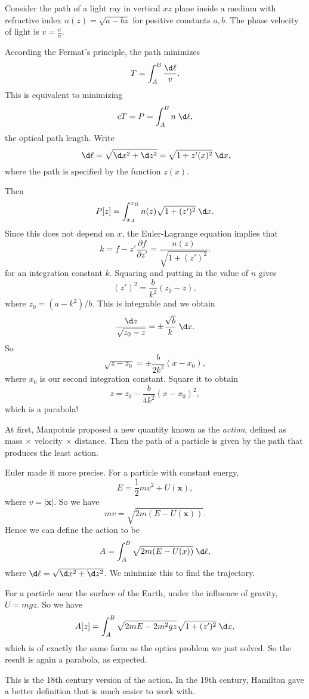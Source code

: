 \documentclass[a4paper]{article}
\begin{document}
\begin{eg}
  Consider the path of a light ray in vertical $xz$ plane inside a medium with refractive index $n(z) = \sqrt{a - bz}$ for positive constants $a, b$. The phase velocity of light is $v = \frac{c}{n}$.

  According the Fermat's principle, the path minimizes
  \[
    T = \int_A^B \frac{\d \ell}{v}.
  \]
  This is equivalent to minimizing
  \[
    cT = P = \int_A^B n\;\d \ell,
  \]
  the optical path length. Write
  \[
    \;\d \ell = \sqrt{\d x^2 + \d z^2} = \sqrt{1 + z'(x)^2}\;\d x,
  \]
  where the path is specified by the function $z(x)$.

  Then
  \[
    P[z] = \int_{x_A}^{x_B}n(z)\sqrt{1 + (z')^2}\;\d x.
  \]
  Since this does not depend on $x$, the Euler-Lagrange equation implies that
  \[
    k = f - z'\frac{\partial f}{\partial z'} = \frac{n(z)}{\sqrt{1 + (z')^2}}.
  \]
  for an integration constant $k$. Squaring and putting in the value of $n$ gives
  \[
    (z')^2 = \frac{b}{k^2}(z_0 - z),
  \]
  where $z_0 = (a - k^2)/b$. This is integrable and we obtain
  \[
    \frac{\d z}{\sqrt{z_0 - z}} = \pm\frac{\sqrt{b}}{k}\;\d x.
  \]
  So
  \[ \sqrt{z - z_0} = \pm \frac{b}{2k^2}(x - x_0),
  \]
  where $x_0$ is our second integration constant. Square it to obtain
  \[
    z = z_0 - \frac{b}{4k^2}(x - x_0)^2,
  \]
  which is a parabola!
\end{eg}

\begin{eg}
  At first, Manpotuis proposed a new quantity known as the \emph{action}, defined as mass $\times$ velocity $\times$ distance. Then the path of a particle is given by the path that produces the least action.

  Euler made it more precise. For a particle with constant energy,
  \[
    E = \frac{1}{2} mv^2 + U(\mathbf{x}),
  \]
  where $v = |\dot{\mathbf{x}}|$. So we have
  \[
    mv = \sqrt{2m(E - U(\mathbf{x}))}.
  \]
  Hence we can define the action to be
  \[
    A = \int_A^B \sqrt{2m(E - U(x))}\;\d \ell,
  \]
  where $\d\ell = \sqrt{\d x^2 + \d z^2}$. We minimize this to find the trajectory.

  For a particle near the surface of the Earth, under the influence of gravity, $U = mgz$. So we have
  \[
    A[z] = \int_A^B \sqrt{2mE - 2m^2gz}\sqrt{1 + (z')^2}\;\d x,
  \]
  which is of exactly the same form as the optics problem we just solved. So the result is again a parabola, as expected.

  This is the 18th century version of the action. In the 19th century, Hamilton gave a better definition that is much easier to work with.
\end{eg}
\end{document}

